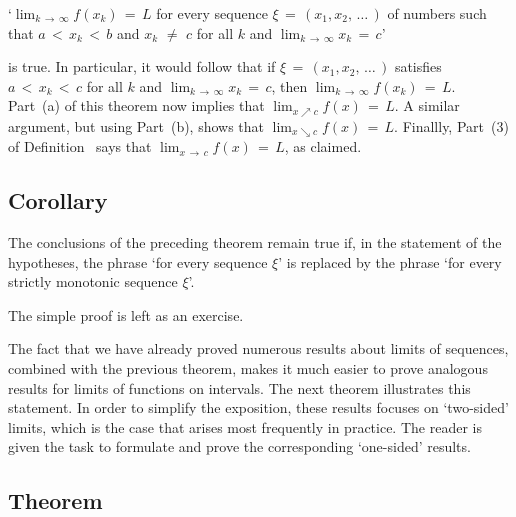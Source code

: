 {`${\displaystyle \lim_{k \,{\rightarrow}\, {\infty}} f(x_{k}) \,=\, L}$ for every sequence ${\xi} \,=\, (x_{1},x_{2},\,{\ldots}\,)$ of numbers such that $a\,<\,x_{k}\,<\,b$ and $x_{k} \,\,{\neq}\,\, c$ for all $k$ and ${\displaystyle \lim_{k \,{\rightarrow}\, {\infty}} x_{k} \,=\, c}$'

is true. In particular, it would follow that if ${\xi} \,=\, (x_{1},x_{2},\,{\ldots}\,)$ satisfies $a\,<\,x_{k}\,<\,c$ for all $k$ and $\lim_{k \,{\rightarrow}\, {\infty}} x_{k} \,=\, c$, then $\lim_{k \,{\rightarrow}\, {\infty}} f(x_{k}) \,=\, L$.
    Part~(a) of this theorem now implies that ${\displaystyle \lim_{x{\nearrow}c}} f(x) \,=\, L$.
    A similar argument, but using Part~(b), shows that $\lim_{x{\searrow}c} f(x) \,=\, L$.
    Finallly, Part~(3) of Definition~ says that ${\displaystyle \lim_{x \,{\rightarrow}\, c} f(x) \,=\, L}$, as claimed.

\V
\V

            \subsection{\small{\bf Corollary}}
            \label{CorC90.45}

\V

        The conclusions of the preceding theorem remain true if, in the statement of the hypotheses,
    the phrase `for every sequence ${\xi}$' is replaced by the phrase `for every strictly monotonic sequence ${\xi}$'.

\V

        The simple proof is left as an exercise. \Q

\V
\V

        The fact that we have already proved numerous results about limits of sequences, combined with the previous theorem,
    makes it much easier to prove analogous results for limits of functions on intervals.
    The next theorem illustrates this statement. In order to simplify the exposition, these results focuses on `two-sided' limits, which is the case that arises most frequently in practice.
    The reader is given the task to formulate and prove the corresponding `one-sided' results.

\V

            \subsection{\small{\bf Theorem}}
            \label{ThmC90.50}

}
